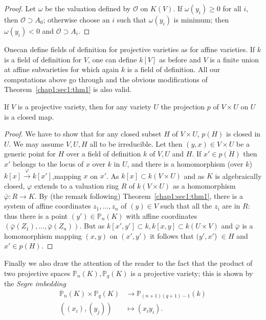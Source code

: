 \begin{proof}%
  Let $\omega $ be the valuation defined by $\mathscr{O}$ on
  $K(V)$. If $\omega (y_i) \ge 0$ for all $i$, then
  $\mathscr{O}\supset A_0$; otherwise choose an $i$ such that $\omega
  (y_i)$ is minimum; then $\omega (y_i) < 0$ and $\mathscr{O} \supset
  A_i$. 
\end{proof}

\begin{remark*}%
  One\pageoriginale can define fields of definition for projective varieties as for
  affine varieties. If $k$ is a field of definition for $V$, one can
  define $k[V]$ as before and $V$ is a finite union at affine
  subvarieties  for which again $k$ is a field of  definition. All our
  computations above go through and the obvious modifications of
  Theorem~\ref{chap1:sec1:thm1} is also valid. 
\end{remark*}

\begin{theorem}\label{chap1:sec1:thm2} %
  If $V$ is a projective  variety, then for any variety $U$ the
  projection $p$ of $V \times U$ on $U$ is a closed map. 
\end{theorem}  
 
\begin{proof}%
  We have to show that for any closed  subset $H$ of $V \times
  U$, $p(H)$ is closed in $U$. We may assume $V,U,H$ all to be
  irreducible. Let then $(y,x) \in V \times U $ be a generic point
  for $H$ over a field of definition $k$ of  $V,U$ and $H$. If $x'\in
  \overline{p(H)}$ then $x'$ belongs  to the locus  of $x$ over $k$ in
  $U$, and  there is a homomorphism (over $k$) $k [x] \xrightarrow{\varphi}
  k [x']$,mapping $x$ on $x'$. As $k[x]
  \subset k (V \times U)$ and as  $K$ is algebraically closed,
  $\varphi$ extends to a valuation ring $R$ of $k(V \times U)$ as a
  homomorphism  $\bar{\varphi}: R \rightarrow K$. By (the  remark
  following) Theorem~\ref{chap1:sec1:thm1}, there  is a system of affine  coordinates
  $z_1,\ldots, z_n$ of $(y)\in V$ such that all  the $z_i$ are in $R$:
  thus  there is a point $(y') \in \mathbb{P}_n (K)$ with affine
  coordinates $(\bar{\varphi} (Z_1),\ldots ,\bar{\varphi} (Z_n))$. But
  as  $k[x', y']\subset k,  k [x,y]\subset k (U \times V)$ and
  $\overline{\varphi}$ is a homomorphism mapping $(x,y)$ on $(x', y')$
  it follows  that $(y',x'$) $\in H$ and \textit{$x' \in p(H)$.} 
\end{proof} 


Finally we also draw the attention of the reader to the fact that the
product of two projective  spaces $\mathbb{P}_n (K),\mathbb{P}_q (K)$
is a projective variety; this is shown by the \textit{Segre imbedding} 
\begin{align*}
  \mathbb{P}_n (K) \times \mathbb{P}_q (K) & \longrightarrow
  \mathbb{P}_{(n+1)(q+1)-1} (k)\\ 
  ((x_i),  (y_j))  &\longmapsto (x_iy_i).
\end{align*} 


